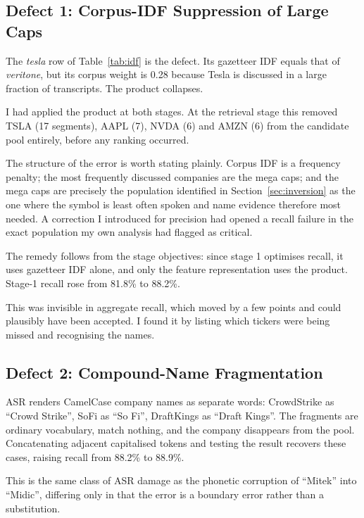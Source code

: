 \documentclass[conference]{IEEEtran}
\begin{document}
\subsection{Defect 1: Corpus-IDF Suppression of Large Caps}
\label{sec:idfbug}

The \emph{tesla} row of Table~\ref{tab:idf} is the defect. Its gazetteer IDF
equals that of \emph{veritone}, but its corpus weight is 0.28 because Tesla is
discussed in a large fraction of transcripts. The product collapses.

I had applied the product at both stages. At the retrieval stage this removed
TSLA (17 segments), AAPL (7), NVDA (6) and AMZN (6) from the candidate pool
entirely, before any ranking occurred.

The structure of the error is worth stating plainly. Corpus IDF is a frequency
penalty; the most frequently discussed companies are the mega caps; and the mega
caps are precisely the population identified in Section~\ref{sec:inversion} as
the one where the symbol is least often spoken and name evidence therefore most
needed. A correction I introduced for precision had opened a recall failure in
the exact population my own analysis had flagged as critical.

The remedy follows from the stage objectives: since stage 1 optimises recall, it
uses gazetteer IDF alone, and only the feature representation uses the product.
Stage-1 recall rose from 81.8\% to 88.2\%.

This was invisible in aggregate recall, which moved by a few points and could
plausibly have been accepted. I found it by listing which tickers were being
missed and recognising the names.

\subsection{Defect 2: Compound-Name Fragmentation}
\label{sec:compound}

ASR renders CamelCase company names as separate words: CrowdStrike as ``Crowd
Strike'', SoFi as ``So Fi'', DraftKings as ``Draft Kings''. The fragments are
ordinary vocabulary, match nothing, and the company disappears from the pool.
Concatenating adjacent capitalised tokens and testing the result recovers these
cases, raising recall from 88.2\% to 88.9\%.

This is the same class of ASR damage as the phonetic corruption of ``Mitek''
into ``Midic'', differing only in that the error is a boundary error rather than
a substitution.
\end{document}
